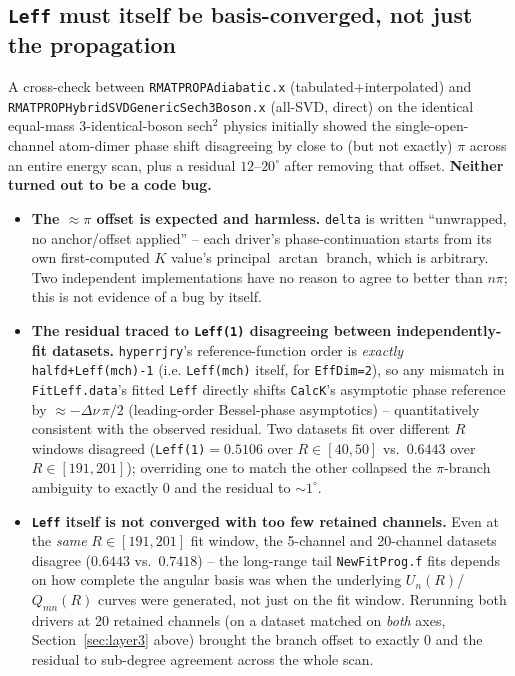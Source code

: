 \documentclass[11pt]{article}
\newcommand{\file}[1]{\texttt{#1}}
\newcommand{\sub}[1]{\texttt{#1}}
\begin{document}
\subsection{\texttt{Leff} must itself be basis-converged, not just the propagation}
\label{sec:leffconv}

A cross-check between \file{RMATPROPAdiabatic.x} (tabulated+interpolated) and
\file{RMATPROPHybridSVDGenericSech3Boson.x} (all-SVD, direct) on the identical equal-mass
3-identical-boson sech$^2$ physics initially showed the single-open-channel atom-dimer phase shift
disagreeing by close to (but not exactly) $\pi$ across an entire energy scan, plus a residual
$12$--$20^\circ$ after removing that offset. \textbf{Neither turned out to be a code bug.}

\begin{itemize}
\item \textbf{The $\approx\pi$ offset is expected and harmless.} \texttt{delta} is written
  ``unwrapped, no anchor/offset applied'' -- each driver's phase-continuation starts from its own
  first-computed $K$ value's principal $\arctan$ branch, which is arbitrary. Two independent
  implementations have no reason to agree to better than $n\pi$; this is not evidence of a bug by
  itself.
\item \textbf{The residual traced to \texttt{Leff(1)} disagreeing between independently-fit
  datasets.} \sub{hyperrjry}'s reference-function order is \emph{exactly}
  \texttt{halfd+Leff(mch)-1} (i.e. \texttt{Leff(mch)} itself, for \texttt{EffDim=2}), so any
  mismatch in \texttt{FitLeff.data}'s fitted \texttt{Leff} directly shifts \sub{CalcK}'s asymptotic
  phase reference by $\approx-\Delta\nu\,\pi/2$ (leading-order Bessel-phase asymptotics) --
  quantitatively consistent with the observed residual. Two datasets fit over different $R$ windows
  disagreed (\texttt{Leff(1)}$=0.5106$ over $R\in[40,50]$ vs.\ $0.6443$ over $R\in[191,201]$);
  overriding one to match the other collapsed the $\pi$-branch ambiguity to exactly $0$ and the
  residual to $\sim1^\circ$.
\item \textbf{\texttt{Leff} itself is not converged with too few retained channels.} Even at the
  \emph{same} $R\in[191,201]$ fit window, the 5-channel and 20-channel datasets disagree
  ($0.6443$ vs.\ $0.7418$) -- the long-range tail \texttt{NewFitProg.f} fits depends on how complete
  the angular basis was when the underlying $U_n(R)$/$Q_{mn}(R)$ curves were generated, not just on
  the fit window. Rerunning both drivers at 20 retained channels (on a dataset matched on
  \emph{both} axes, Section~\ref{sec:layer3} above) brought the branch offset to exactly $0$ and
  the residual to sub-degree agreement across the whole scan.
\end{itemize}
\end{document}
